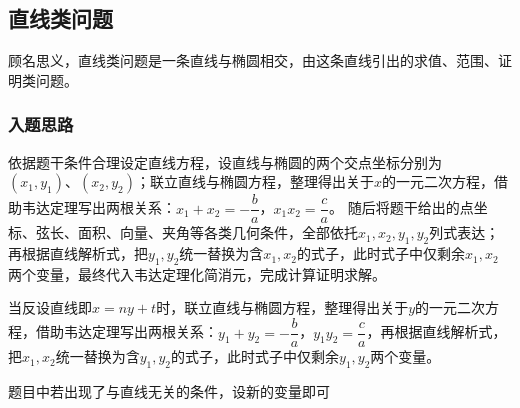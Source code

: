 \subsection{直线类问题}
顾名思义，直线类问题是一条直线与椭圆相交，由这条直线引出的求值、范围、证明类问题。

\subsubsection*{入题思路}
依据题干条件合理设定直线方程，设直线与椭圆的两个交点坐标分别为\((x_1, y_1)、(x_2, y_2)\)；联立直线与椭圆方程，整理得出关于$x$的一元二次方程，借助韦达定理写出两根关系：\(x_1+x_2=-\dfrac{b}{a}\)，\(x_1x_2=\dfrac{c}{a}\)。
随后将题干给出的点坐标、弦长、面积、向量、夹角等各类几何条件，全部依托\(x_1,x_2,y_1,y_2\)列式表达；再根据直线解析式，把$y_1,y_2$统一替换为含$x_1,x_2$的式子，此时式子中仅剩余$x_1,x_2$两个变量，最终代入韦达定理化简消元，完成计算证明求解。

当反设直线即$x = ny + t$时，联立直线与椭圆方程，整理得出关于$y$的一元二次方程，借助韦达定理写出两根关系：\(y_1+y_2=-\dfrac{b}{a}\)，\(y_1y_2=\dfrac{c}{a}\)，再根据直线解析式，把$x_1,x_2$统一替换为含$y_1,y_2$的式子，此时式子中仅剩余$y_1,y_2$两个变量。

\begin{remark}
    题目中若出现了与直线无关的条件，设新的变量即可
\end{remark}
